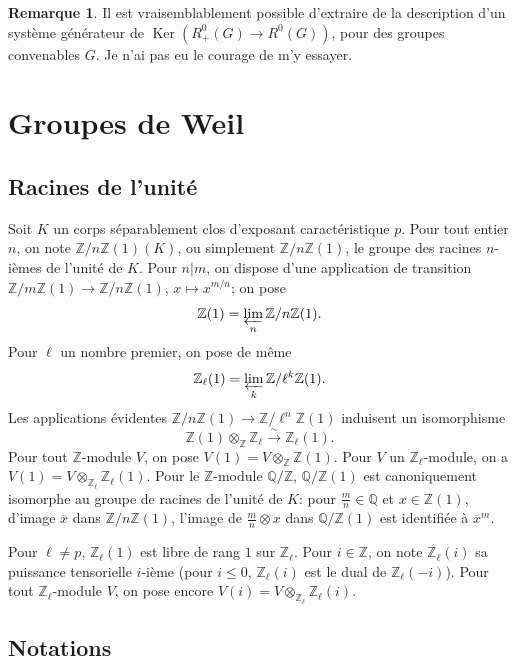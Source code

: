 \documentclass[11pt,a4paper]{amsart}
\theoremstyle{plain}
\theoremstyle{definition}
\newtheorem{remark}[theorem]{Remarque}
\DeclareMathOperator{\Ker}{Ker}
\newcommand{\dbZ}{\mathbb{Z}}
\newcommand{\dbQ}{\mathbb{Q}}
\newenvironment{para}{\par\noindent}{\par}
\newcommand{\ov}[1]{\overline{#1}}
\newcommand{\isom}{\xrightarrow{\sim}}
\begin{document}
\begin{remark}\label{rem1.15}
Il est vraisemblablement possible d'extraire de \cite{9} la description d'un syst\`eme g\'en\'erateur de $\Ker(R_{+}^{0}(G) \longrightarrow R^{0}(G))$, pour des groupes convenables $G$. Je n'ai pas eu le courage de m'y essayer.
\end{remark}


\section{Groupes de Weil}

\subsection{Racines de l'unit\'e}

\begin{para}
Soit $K$ un corps s\'eparablement clos d'exposant caract\'eristique $p$. Pour tout entier $n$, on note $\dbZ/n\dbZ(1)(K)$, ou simplement $\dbZ/n\dbZ(1)$, le groupe des racines $n$-i\`emes de l'unit\'e de $K$. Pour $n|m$, on dispose d'une application de transition $\dbZ/m\dbZ(1) \to \dbZ/n\dbZ(1)$, $x \mapsto x^{m/n}$; on pose
\[
\dbZ(1) = \varprojlim_{n} \dbZ/n\dbZ(1).
\]
Pour $\ell$ un nombre premier, on pose de m\^eme
\[
\dbZ_{\ell}(1) = \varprojlim_{k} \dbZ/\ell^{k}\dbZ(1).
\]
Les applications \'evidentes $\dbZ/n\dbZ(1) \to \dbZ/\ell^{n}\dbZ(1)$ induisent un isomorphisme
\[
\dbZ(1) \otimes_{\dbZ} \dbZ_{\ell} \isom \dbZ_{\ell}(1).
\]
Pour tout $\dbZ$-module $V$, on pose $V(1) = V \otimes_{\dbZ} \dbZ(1)$. Pour $V$ un $\dbZ_{\ell}$-module, on a $V(1) = V \otimes_{\dbZ_{\ell}} \dbZ_{\ell}(1)$. Pour le $\dbZ$-module $\dbQ/\dbZ$, $\dbQ/\dbZ(1)$ est canoniquement isomorphe au groupe de racines de l'unit\'e de $K$: pour $\frac{m}{n} \in \dbQ$ et $x \in \dbZ(1)$, d'image $\ov{x}$ dans $\dbZ/n\dbZ(1)$, l'image de $\frac{m}{n} \otimes x$ dans $\dbQ/\dbZ(1)$ est identifi\'ee \`a $\ov{x}^{m}$.
\end{para}

\begin{para}
Pour $\ell \not= p$, $\dbZ_{\ell}(1)$ est libre de rang $1$ sur $\dbZ_{\ell}$. Pour $i \in \dbZ$, on note $\dbZ_{\ell}(i)$ sa puissance tensorielle $i$-i\`eme (pour $i \leq 0$, $\dbZ_{\ell}(i)$ est le dual de $\dbZ_{\ell}(-i)$). Pour tout $\dbZ_{\ell}$-module $V$, on pose encore $V(i) = V \otimes_{\dbZ_{\ell}} \dbZ_{\ell}(i)$.
\end{para}

\subsection{Notations}
\end{document}

